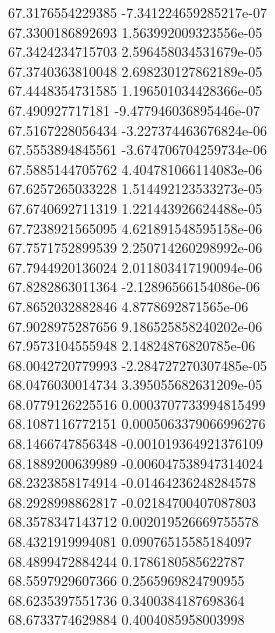 {67.3176554229385 -7.341224659285217e-07
 \\
67.3300186892693 1.563992009323556e-05
 \\
67.3424234715703 2.596458034531679e-05
 \\
67.3740363810048 2.698230127862189e-05
 \\
67.4448354731585 1.196501034428366e-05
 \\
67.490927717181 -9.477946036895446e-07
 \\
67.5167228056434 -3.227374463676824e-06
 \\
67.5553894845561 -3.674706704259734e-06
 \\
67.5885144705762 4.404781066114083e-06
 \\
67.6257265033228 1.514492123533273e-05
 \\
67.6740692711319 1.221443926624488e-05
 \\
67.7238921565095 4.621891548595158e-06
 \\
67.7571752899539 2.250714260298992e-06
 \\
67.7944920136024 2.011803417190094e-06
 \\
67.8282863011364 -2.12896566154086e-06
 \\
67.8652032882846 4.8778692871565e-06
 \\
67.9028975287656 9.186525858240202e-06
 \\
67.9573104555948 2.14824876820785e-06
 \\
68.0042720779993 -2.284727270307485e-05
 \\
68.0476030014734 3.395055682631209e-05
 \\
68.0779126225516 0.0003707733994815499
 \\
68.1087116772151 0.0005063379066996276
 \\
68.1466747856348 -0.001019364921376109
 \\
68.1889200639989 -0.006047538947314024
 \\
68.2323858174914 -0.01464236248284578
 \\
68.2928998862817 -0.02184700407087803
 \\
68.3578347143712 0.002019526669755578
 \\
68.4321919994081 0.09076515585184097
 \\
68.4899472884244 0.1786180585622787
 \\
68.5597929607366 0.2565969824790955
 \\
68.6235397551736 0.3400384187698364
 \\
68.6733774629884 0.4004085958003998
 \\
}
